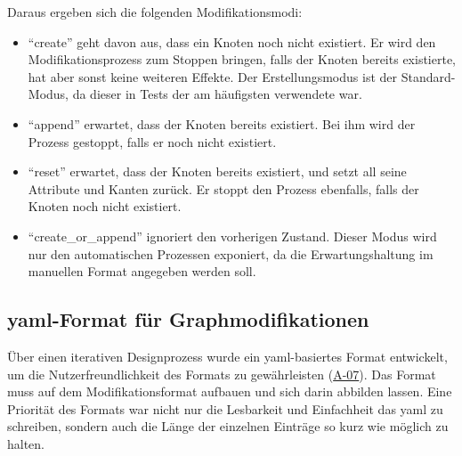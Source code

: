 Daraus ergeben sich die folgenden Modifikationsmodi:

\begin{itemize}
    \itemsep0em
    \item \enquote{create} geht davon aus, dass ein Knoten noch nicht existiert.
    Er wird den Modifikationsprozess zum Stoppen bringen, falls der Knoten bereits existierte, hat aber sonst keine weiteren Effekte.
    Der Erstellungsmodus ist der Standard-Modus, da dieser in Tests der am häufigsten verwendete war.
    \item \enquote{append} erwartet, dass der Knoten bereits existiert.
    Bei ihm wird der Prozess gestoppt, falls er noch nicht existiert.
    \item \enquote{reset} erwartet, dass der Knoten bereits existiert, und setzt all seine Attribute und Kanten zurück.
    Er stoppt den Prozess ebenfalls, falls der Knoten noch nicht existiert.
    \item \enquote{create\_or\_append} ignoriert den vorherigen Zustand.
    Dieser Modus wird nur den automatischen Prozessen exponiert, da die Erwartungshaltung im manuellen Format angegeben werden soll.
\end{itemize}

\subsection{\acrshort{yaml}-Format für Graphmodifikationen}\label{subsec:modell-graph-modification-yaml}

Über einen iterativen Designprozess wurde ein \acrshort{yaml}-basiertes Format entwickelt, um die Nutzerfreundlichkeit des Formats zu gewährleisten (\hyperref[subsec:req-manual-format-modification]{A-07}).
Das Format muss auf dem Modifikationsformat aufbauen und sich darin abbilden lassen.
Eine Priorität des Formats war nicht nur die Lesbarkeit und Einfachheit das \acrshort{yaml} zu schreiben, sondern auch die Länge der einzelnen Einträge so kurz wie möglich zu halten.

